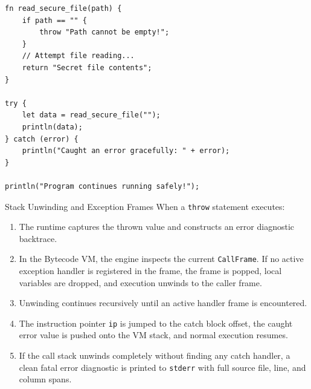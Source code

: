 \begin{lstlisting}[language=shaelang]
fn read_secure_file(path) {
    if path == "" {
        throw "Path cannot be empty!";
    }
    // Attempt file reading...
    return "Secret file contents";
}

try {
    let data = read_secure_file("");
    println(data);
} catch (error) {
    println("Caught an error gracefully: " + error);
}

println("Program continues running safely!");
\end{lstlisting}

\begin{deepbox}{Stack Unwinding and Exception Frames}
When a \texttt{throw} statement executes:
\begin{enumerate}
    \item The runtime captures the thrown value and constructs an error diagnostic backtrace.
    \item In the Bytecode VM, the engine inspects the current \texttt{CallFrame}. If no active exception handler is registered in the frame, the frame is popped, local variables are dropped, and execution unwinds to the caller frame.
    \item Unwinding continues recursively until an active handler frame is encountered.
    \item The instruction pointer \texttt{ip} is jumped to the catch block offset, the caught error value is pushed onto the VM stack, and normal execution resumes.
    \item If the call stack unwinds completely without finding any catch handler, a clean fatal error diagnostic is printed to \texttt{stderr} with full source file, line, and column spans.
\end{enumerate}
\end{deepbox}
